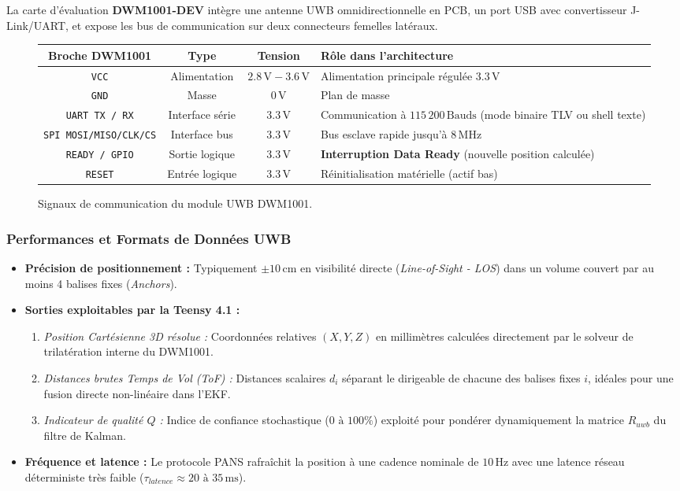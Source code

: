 \documentclass[../Materiel.tex]{subfiles}
\begin{document}
La carte d'évaluation \textbf{DWM1001-DEV} intègre une antenne UWB omnidirectionnelle en PCB, un port USB avec convertisseur J-Link/UART, et expose les bus de communication sur deux connecteurs femelles latéraux.

\begin{figure}[htbp]
\centering
\small
\begin{tabular}{|c|c|c|l|}
\hline
\textbf{Broche DWM1001} & \textbf{Type} & \textbf{Tension} & \textbf{Rôle dans l'architecture} \\
\hline
\texttt{VCC} & Alimentation & $2.8\,\text{V} - 3.6\,\text{V}$ & Alimentation principale régulée $3.3\,\text{V}$ \\
\texttt{GND} & Masse & $0\,\text{V}$ & Plan de masse \\
\texttt{UART TX / RX} & Interface série & $3.3\,\text{V}$ & Communication à $115\,200\,\text{Bauds}$ (mode binaire TLV ou shell texte) \\
\texttt{SPI MOSI/MISO/CLK/CS}& Interface bus & $3.3\,\text{V}$ & Bus esclave rapide jusqu'à $8\,\text{MHz}$ \\
\texttt{READY / GPIO} & Sortie logique & $3.3\,\text{V}$ & \textbf{Interruption Data Ready} (nouvelle position calculée) \\
\texttt{RESET} & Entrée logique & $3.3\,\text{V}$ & Réinitialisation matérielle (actif bas) \\
\hline
\end{tabular}
\caption{Signaux de communication du module UWB DWM1001.}
\end{figure}

\subsubsection{Performances et Formats de Données UWB}
\begin{itemize}
    \item \textbf{Précision de positionnement :} Typiquement $\pm 10\,\text{cm}$ en visibilité directe (\textit{Line-of-Sight - LOS}) dans un volume couvert par au moins 4 balises fixes (\textit{Anchors}).
    \item \textbf{Sorties exploitables par la Teensy 4.1 :}
    \begin{enumerate}
        \item \textit{Position Cartésienne 3D résolue :} Coordonnées relatives $(X, Y, Z)$ en millimètres calculées directement par le solveur de trilatération interne du DWM1001.
        \item \textit{Distances brutes Temps de Vol (ToF) :} Distances scalaires $d_i$ séparant le dirigeable de chacune des balises fixes $i$, idéales pour une fusion directe non-linéaire dans l'EKF.
        \item \textit{Indicateur de qualité $Q$ :} Indice de confiance stochastique ($0\text{ à }100\%$) exploité pour pondérer dynamiquement la matrice $R_{uwb}$ du filtre de Kalman.
    \end{enumerate}
    \item \textbf{Fréquence et latence :} Le protocole PANS rafraîchit la position à une cadence nominale de \textbf{$10\,\text{Hz}$} avec une latence réseau déterministe très faible ($\tau_{latence} \approx 20\text{ à }35\,\text{ms}$).
\end{itemize}
\end{document}
